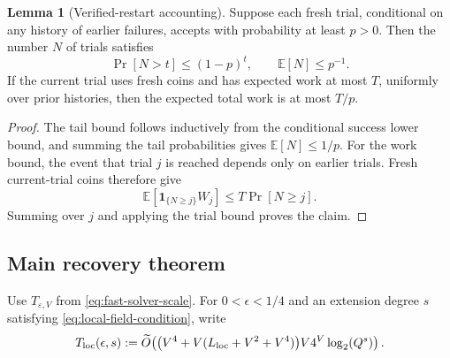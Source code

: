 \documentclass[11pt,a4paper]{article}
\theoremstyle{definition}
\newtheorem{lemma}[theorem]{Lemma}
\theoremstyle{remark}
\begin{document}
\begin{lemma}[Verified-restart accounting]\label{lem:restart-accounting}
Suppose each fresh trial, conditional on any history of earlier failures, accepts with probability at least $p>0$.  Then the number $N$ of trials satisfies
\[
\Pr[N>t]\le(1-p)^t,
\qquad
\mathbb E[N]\le p^{-1}.
\]
If the current trial uses fresh coins and has expected work at most $T$, uniformly over prior histories, then the expected total work is at most $T/p$.
\end{lemma}

\begin{proof}
The tail bound follows inductively from the conditional success lower bound, and summing the tail probabilities gives $\mathbb E[N]\le1/p$.  For the work bound, the event that trial $j$ is reached depends only on earlier trials.  Fresh current-trial coins therefore give
\[
\mathbb E\!\left[\mathbf 1_{\{N\ge j\}}W_j\right]
\le T\Pr[N\ge j].
\]
Summing over $j$ and applying the trial bound proves the claim.
\end{proof}

\subsection{Main recovery theorem}\label{subsec:main-theorem}
Use $T_{\varepsilon,V}$ from \eqref{eq:fast-solver-scale}.  For $0<\epsilon<1/4$ and an extension degree $s$ satisfying \eqref{eq:local-field-condition}, write
\[
 T_{\rm loc}(\epsilon,s):=
 \widetilde O\!\left(
 \bigl(V^4+V(L_{\rm loc}+V^2+V^4)\bigr)V4^V\log_2(Q^s)
 \right).
\]
\end{document}
